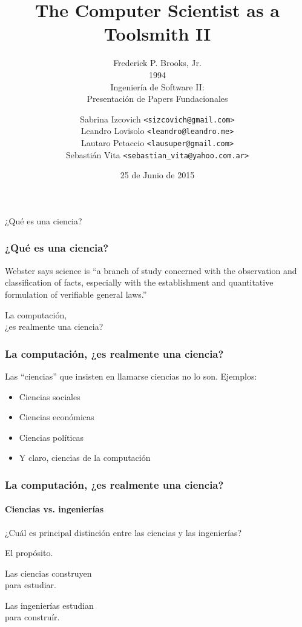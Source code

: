 \documentclass[spanish]{beamer}
\title{The Computer Scientist as a Toolsmith II}
\subtitle{
  Frederick P. Brooks, Jr. \\
  1994 \\
  \vspace{2em}
  Ingeniería de Software II: \\
  Presentación de Papers Fundacionales
}
\author{
  Sabrina Izcovich \texttt{<sizcovich@gmail.com>} \\
  Leandro Lovisolo \texttt{<leandro@leandro.me>} \\
  Lautaro Petaccio \texttt{<lausuper@gmail.com>} \\
  Sebastián Vita \texttt{<sebastian\_vita@yahoo.com.ar>}
}
\date{25 de Junio de 2015}
\institute{
  Departamento de Computación \\
  Facultad de Ciencias Exactas y Naturales \\
  Universidad de Buenos Aires
}
\begin{document}
\begin{frame}
  \titlepage
\end{frame}

\begin{frame}
  \begin{center}
    \Huge{
      ¿Qué es una ciencia?
    }
  \end{center}
\end{frame}

\begin{frame}
  \frametitle{¿Qué es una ciencia?}

  Webster says science is ``a branch of study concerned
  with the observation and classification of facts, especially
  with the establishment and quantitative formulation
  of verifiable general laws.''
\end{frame}

\begin{frame}
  \begin{center}
    \Huge{
      La computación,\\
      ¿es realmente una ciencia?
    }
  \end{center}
\end{frame}

\begin{frame}
  \frametitle{La computación, ¿es realmente una ciencia?}

  Las ``ciencias'' que insisten en llamarse ciencias no lo son.
  \pause
  Ejemplos:
  \pause

  \begin{itemize}
    \item Ciencias sociales \pause
    \item Ciencias económicas \pause
    \item Ciencias políticas \pause
    \item Y claro, ciencias de la computación
  \end{itemize}
\end{frame}

\begin{frame}
  \frametitle{La computación, ¿es realmente una ciencia?}
  \framesubtitle{Ciencias vs. ingenierías}

  \pause

  ¿Cuál es principal distinción entre las ciencias y las ingenierías?

  \pause

  \vspace{2em}
  El propósito.
\end{frame}


\begin{frame}
  \begin{center}
    \Huge{
      Las ciencias construyen \\
      para estudiar.

      \vspace{2em}

      Las ingenierías estudian \\
      para construír.
    }
  \end{center}
\end{frame}
\end{document}
